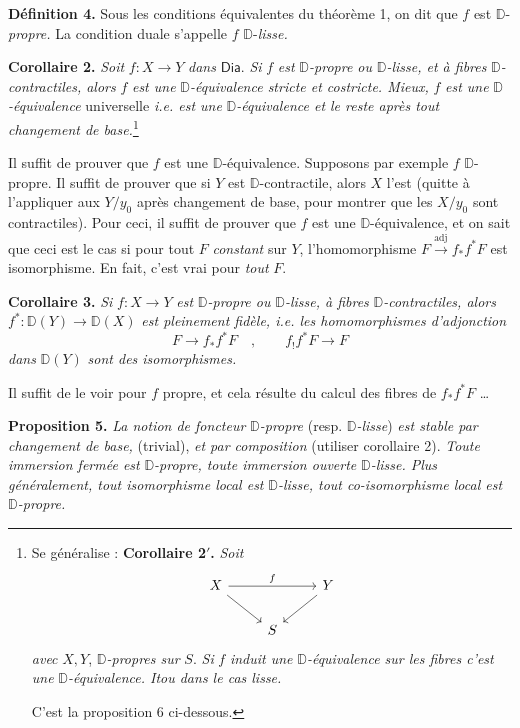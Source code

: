 \documentclass[11pt]{article}
\newcommand{\printedpage}[1]{\marginpar{\footnotesize p.~#1}}
\newcommand{\msp}[1]{\marginpar{\footnotesize [#1]}}
\newcommand{\D}{\mathbb{D}}
\newcommand{\Dia}{\mathsf{Dia}}
\begin{document}
\noindent\textbf{Définition 4.} Sous les conditions équivalentes du théorème 1, on dit que $f$ est $\D$-\textit{propre.} La condition duale s'appelle $f$ $\D$-\textit{lisse.}

\noindent\textbf{Corollaire 2.} \textit{Soit} $f : X \to Y$ \textit{dans} $\Dia$. \textit{Si} $f$ \textit{est} $\D$\textit{-propre ou} $\D$\textit{-lisse, et à fibres} $\D$\textit{-contractiles, alors} $f$ \textit{est une} $\D$\textit{-équivalence stricte et costricte. Mieux,} $f$ \textit{est une} $\D$\textit{-équivalence} universelle \textit{i.e. est une} $\D$\textit{-équivalence et le reste après tout changement de base.}\footnote[31]{Se généralise : \textbf{Corollaire 2$'$.} \textit{Soit}
\[
\begin{tikzcd}[ampersand replacement=\&]
X \arrow[rr, "f"] \arrow[dr] \& \& Y \arrow[dl] \\
\& S \&
\end{tikzcd}
\]
\textit{avec} $X, Y$, $\D$\textit{-propres sur} $S$. \textit{Si} $f$ \textit{induit une} $\D$\textit{-équivalence sur les fibres c'est une} $\D$\textit{-équivalence. Itou dans le cas lisse.}\par
C'est la proposition 6 ci-dessous.}

\printedpage{42}
\msp{page 71}

\noindent Il suffit de prouver que $f$ est une $\D$-équivalence. Supposons par exemple $f$ $\D$-propre. Il suffit de prouver que si $Y$ est $\D$-contractile, alors $X$ l'est (quitte à l'appliquer aux $Y/y_0$ après changement de base, pour montrer que les $X/y_0$ sont contractiles). Pour ceci, il suffit de prouver que $f$ est une $\D$-équivalence, et on sait que ceci est le cas si pour tout $F$ \textit{constant} sur $Y$, l'homomorphisme $F \overset{\text{adj}}{\longrightarrow} f_*f^*F$ est isomorphisme. En fait, c'est vrai pour \textit{tout} $F$.

\noindent\textbf{Corollaire 3.} \textit{Si} $f : X \to Y$ \textit{est} $\D$\textit{-propre ou} $\D$\textit{-lisse, à fibres} $\D$\textit{-contractiles, alors} $f^* : \D(Y) \to \D(X)$ \textit{est pleinement fidèle, i.e. les homomorphismes d'adjonction}
\[
F \longrightarrow f_*f^*F \quad , \qquad f_!f^*F \longrightarrow F
\]
\textit{dans} $\D(Y)$ \textit{sont des isomorphismes.}

\noindent Il suffit de le voir pour $f$ propre, et cela résulte du calcul des fibres de $f_*f^*F$ \ldots

\noindent\textbf{Proposition 5.} \textit{La notion de foncteur} $\D$\textit{-propre} (resp. $\D$\textit{-lisse}) \textit{est stable par changement de base,} (trivial), \textit{et par composition} (utiliser corollaire 2). \textit{Toute immersion fermée est} $\D$\textit{-propre, toute immersion ouverte} $\D$\textit{-lisse. Plus généralement, tout isomorphisme local est} $\D$\textit{-lisse, tout co-isomorphisme local est} $\D$\textit{-propre.}
\end{document}
